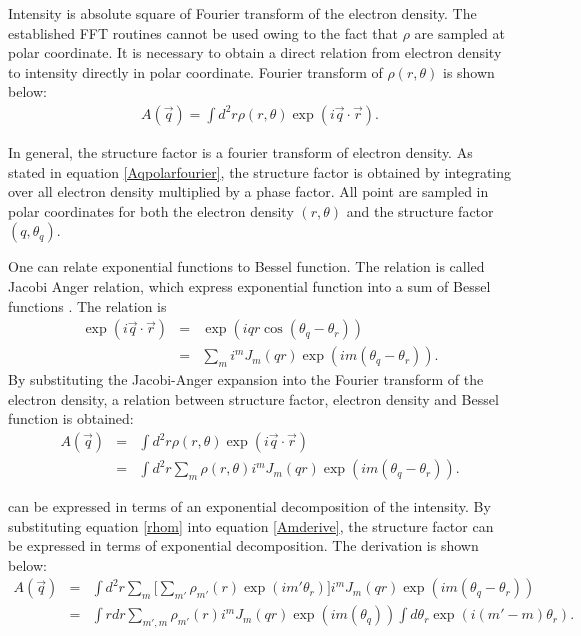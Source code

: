 Intensity is absolute square of Fourier transform of the electron density. The established FFT routines cannot be used owing to the fact that $\rho$ are sampled at polar coordinate. It is necessary to obtain a direct relation from electron density to intensity directly in polar coordinate. Fourier transform of $\rho(r,\theta)$ is shown below:
\begin{eqnarray}
\label{Aqpolarfourier}
A(\vec{q}) = \int d^{2}r \rho(r,\theta) \exp(i \vec{q} \cdot \vec{r}).  
\end{eqnarray}

In general, the structure factor is a fourier transform of electron density. As stated in equation \ref{Aqpolarfourier}, the structure factor is obtained by integrating over all electron density multiplied by a phase factor. All point are sampled in polar coordinates for both the electron density $(r,\theta)$ and the structure factor $(q,\theta_{q})$. 

One can relate exponential functions to Bessel function. The relation is called Jacobi Anger relation, which express exponential function into a sum of Bessel functions \cite{jacobianger}. The relation is
\begin{eqnarray}
\label{jacobanger}
\exp(i \vec{q} \cdot \vec{r} ) &=& \exp(i q r \cos( \theta_{q}-\theta_{r} ))  \\
&=& \sum_{m} i^{m} J_{m}(q r) \exp(i m ( \theta_{q}-\theta_{r} ) ). 
\end{eqnarray}
By substituting the Jacobi-Anger expansion into the Fourier transform of the electron density, a relation between structure factor, electron density and Bessel function is obtained: 
\begin{eqnarray}
\label{Amderive}
A(\vec{q}) &=& \int d^{2}r \rho(r,\theta) \exp(i \vec{q} \cdot \vec{r})  \\ 
&=& \int d^{2}r \sum_{m} \rho(r,\theta) i^m J_{m}(q r) \exp(i m ( \theta_{q}-\theta_{r} )).
\end{eqnarray}

\Bmq can be expressed in terms of an exponential decomposition of the intensity. By substituting equation \ref{rhom} into equation \ref{Amderive}, the structure factor can be expressed in terms of exponential decomposition. The derivation is shown below:
\begin{eqnarray}
\label{Amderive2}
A(\vec{q})&=& \int d^{2}r \sum_{m} \bigg[\sum_{m'} \rho_{m'}(r) \exp(i m' \theta_{r}) \bigg] i^m J_{m}(q r) \exp(i m ( \theta_{q}-\theta_{r} )) \\
&=& \int r dr \sum_{m',m} \rho_{m'}(r) i^m J_{m}(q r) \exp(i m ( \theta_{q})) \int d\theta_{r} \exp(i (m'-m) \theta_{r}).
\end{eqnarray}

